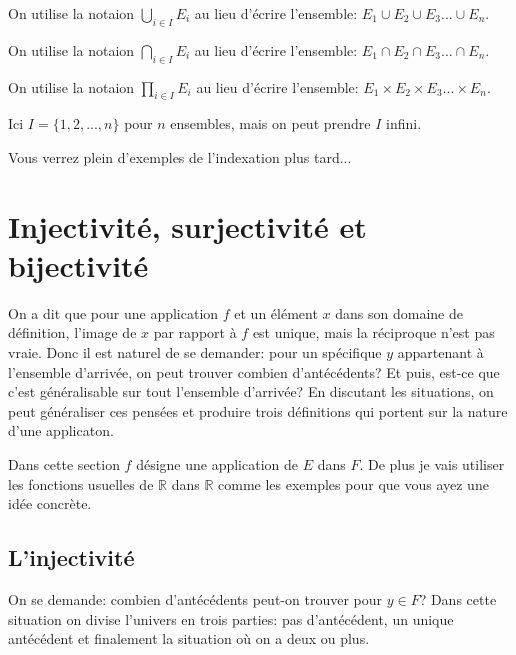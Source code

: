 \documentclass{article}
\begin{document}
\begin{tcolorbox}[colback=yellow!5!white,colframe=yellow!75!black,title={Notation 3.3: Généralisation de la réunion, de l'intersection et du produit cartésien}]



On utilise la notaion $\bigcup\limits_{i \in I} E_i$ au lieu d'écrire l'ensemble: $E_{1}\cup E_{2}\cup E_{3} ... \cup E_{n}$.



On utilise la notaion $\bigcap\limits_{i \in I} E_i$ au lieu d'écrire l'ensemble: $E_{1}\cap E_{2}\cap E_{3} ... \cap E_{n}$.

On utilise la notaion $\prod\limits_{i \in I} E_i$ au lieu d'écrire l'ensemble: $E_{1}\times E_{2}\times E_{3} ... \times E_{n}$.

\tcblower

Ici $I = \{1,2, ... ,n\}$ pour $n$ ensembles, mais on peut prendre $I$ infini.


\end{tcolorbox}

Vous verrez plein d'exemples de l'indexation plus tard...


\section{Injectivité, surjectivité et bijectivité}

On a dit que pour une application $f$ et un élément $x$ dans son domaine de définition, l'image de $x$ par rapport à $f$ est unique, mais la réciproque n'est pas vraie. Donc il est naturel de se demander: pour un spécifique $y$ appartenant à l'ensemble d'arrivée, on peut trouver combien d'antécédents? Et puis, est-ce que c'est généralisable sur tout l'ensemble d'arrivée? En discutant les situations, on peut généraliser ces pensées et produire trois définitions qui portent sur la nature d'une applicaton.

Dans cette section $f$ désigne une application de $E$ dans $F$. De plus je vais utiliser les fonctions usuelles de $\mathbb{R}$ dans $\mathbb{R}$ comme les exemples pour que vous ayez une idée concrète.

\subsection{L'injectivité}

On se demande: combien d'antécédents peut-on trouver pour $y \in F$? Dans cette situation on divise l'univers en trois parties: pas d'antécédent, un unique antécédent et finalement la situation où on a deux ou plus.
\end{document}
